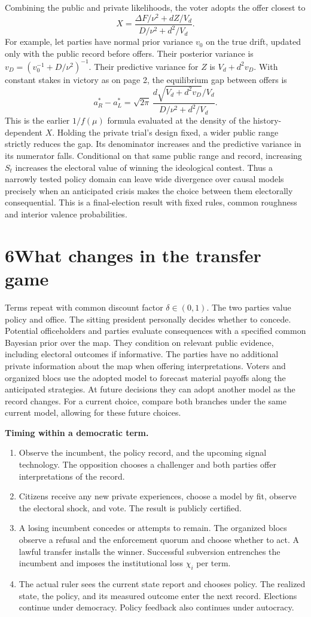 \documentclass[11pt,letterpaper]{article}
\newcommand{\sect}[1]{\section*{\color{ink}#1}}
\newcommand{\lead}[1]{\textbf{#1}\enspace}
\begin{document}
Combining the public and private likelihoods, the voter adopts the offer closest to
\[
 X=\frac{\Delta F/\nu^2+dZ/V_d}{D/\nu^2+d^2/V_d}.
\]
For example, let parties have normal prior variance $v_0$ on the true drift, updated only with the public record before offers. Their posterior variance is $v_D=(v_0^{-1}+D/\nu^2)^{-1}$. Their predictive variance for $Z$ is $V_d+d^2v_D$. With constant stakes in victory as on page 2, the equilibrium gap between offers is
\[
 a_R^*-a_L^*
 =\sqrt{2\pi}\,
   \frac{d\sqrt{V_d+d^2v_D}/V_d}{D/\nu^2+d^2/V_d}.
\]
This is the earlier $1/f(\mu)$ formula evaluated at the density of the history-dependent $X$. Holding the private trial's design fixed, a wider public range strictly reduces the gap. Its denominator increases and the predictive variance in its numerator falls. Conditional on that same public range and record, increasing $S_t$ increases the electoral value of winning the ideological contest. Thus a narrowly tested policy domain can leave wide divergence over causal models precisely when an anticipated crisis makes the choice between them electorally consequential. This is a final-election result with fixed rules, common roughness and interior valence probabilities.

\newpage
\sect{6\quad What changes in the transfer game}
Terms repeat with common discount factor $\delta\in(0,1)$. The two parties value policy and office. The sitting president personally decides whether to concede. Potential officeholders and parties evaluate consequences with a specified common Bayesian prior over the map. They condition on relevant public evidence, including electoral outcomes if informative. The parties have no additional private information about the map when offering interpretations. Voters and organized blocs use the adopted model to forecast material payoffs along the anticipated strategies. At future decisions they can adopt another model as the record changes. For a current choice, compare both branches under the same current model, allowing for these future choices.

\lead{Timing within a democratic term.}
\begin{enumerate}
\setlength{\itemsep}{1pt}
\item Observe the incumbent, the policy record, and the upcoming signal technology. The opposition chooses a challenger and both parties offer interpretations of the record.
\item Citizens receive any new private experiences, choose a model by fit, observe the electoral shock, and vote. The result is publicly certified.
\item A losing incumbent concedes or attempts to remain. The organized blocs observe a refusal and the enforcement quorum and choose whether to act. A lawful transfer installs the winner. Successful subversion entrenches the incumbent and imposes the institutional loss $\chi_i$ per term.
\item The actual ruler sees the current state report and chooses policy. The realized state, the policy, and its measured outcome enter the next record. Elections continue under democracy. Policy feedback also continues under autocracy.
\end{enumerate}
\end{document}
